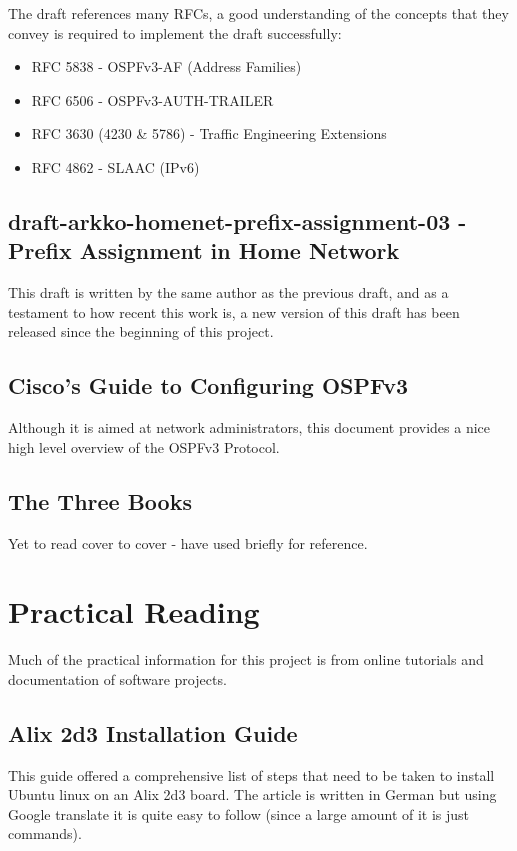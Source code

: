 \documentclass[12pt]{report}
\begin{document}
The draft references many RFCs, a good understanding of the concepts 
that they convey is required to implement the draft successfully:

\begin{itemize}
	\item RFC 5838 - OSPFv3-AF (Address Families)
	\item RFC 6506 - OSPFv3-AUTH-TRAILER
	\item RFC 3630 (4230 \& 5786) - Traffic Engineering Extensions 
	\item RFC 4862 - SLAAC (IPv6) 
\end{itemize}


\subsection{draft-arkko-homenet-prefix-assignment-03 - Prefix Assignment in Home Network}
 		
This draft is written by the same author as the previous draft, and as a
testament to how recent this work is, a new version of this draft has
been released since the beginning of this project. 



\subsection{Cisco's Guide to Configuring OSPFv3}

Although it is aimed at network administrators, this document provides a
nice high level overview of the OSPFv3 Protocol.

\subsection{The Three Books}


Yet to read cover to cover - have used briefly for reference. 

\section{Practical Reading}		
Much of the practical information for this project is from online tutorials and
documentation of software projects.  

\subsection{Alix 2d3 Installation Guide}
This guide offered a comprehensive list of steps that need to be taken
to install Ubuntu linux on an Alix 2d3 board.  The article is written in
German but using Google translate it is quite easy to follow (since a
large amount of it is just commands).  
\end{document}
